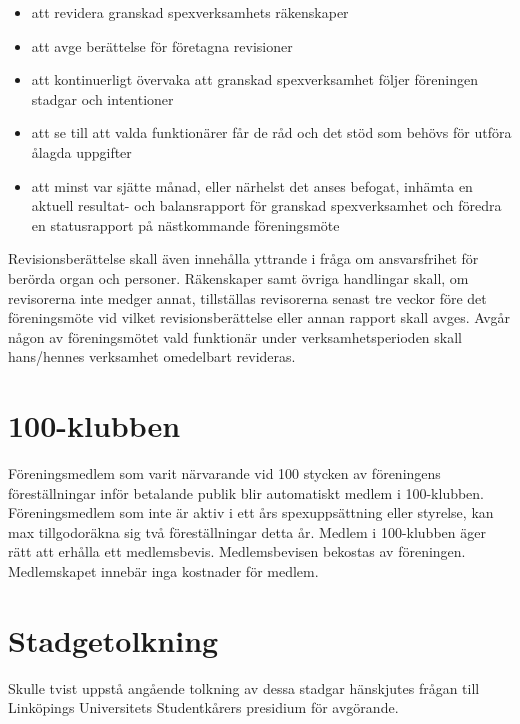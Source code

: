 \documentclass[a4paper]{article}
\begin{document}
\begin{itemize}
  \item att revidera granskad spexverksamhets räkenskaper
  \item att avge berättelse för företagna revisioner
  \item att kontinuerligt övervaka att granskad spexverksamhet följer föreningen stadgar och intentioner
  \item att se till att valda funktionärer får de råd och det stöd som behövs för utföra ålagda uppgifter
  \item att minst var sjätte månad, eller närhelst det anses befogat, inhämta en aktuell resultat- och balansrapport för granskad spexverksamhet och föredra en statusrapport på nästkommande föreningsmöte
\end{itemize}

\noindent
Revisionsberättelse skall även innehålla yttrande i fråga om ansvarsfrihet för berörda organ och personer.\newline
\newline
Räkenskaper samt övriga handlingar skall, om revisorerna inte medger annat, tillställas revisorerna senast tre veckor före det föreningsmöte vid vilket revisionsberättelse eller annan rapport skall avges.\newline
\newline
Avgår någon av föreningsmötet vald funktionär under verksamhetsperioden skall hans/hennes verksamhet omedelbart revideras.

\section{100-klubben}
\label{section:100-klubben}

Föreningsmedlem som varit närvarande vid 100 stycken av föreningens föreställningar inför betalande publik blir automatiskt medlem i 100-klubben.\newline
\newline
Föreningsmedlem som inte är aktiv i ett års spexuppsättning eller styrelse, kan max tillgodoräkna sig två föreställningar detta år.\newline
\newline
Medlem i 100-klubben äger rätt att erhålla ett medlemsbevis. Medlemsbevisen bekostas av föreningen.\newline
\newline
Medlemskapet innebär inga kostnader för medlem.

\section{Stadgetolkning}
Skulle tvist uppstå angående tolkning av dessa stadgar hänskjutes frågan till Linköpings Universitets Studentkårers presidium för avgörande.
\end{document}

